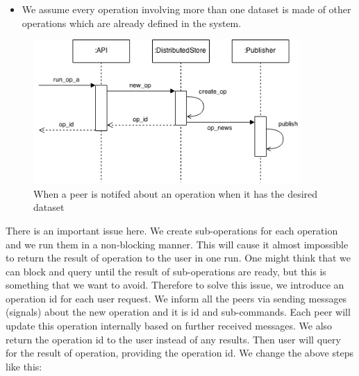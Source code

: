 \begin{itemize}
\item We assume every operation involving more than one dataset is made of
other operations which are already defined in the system.
\end{itemize}

\begin{figure}[h]
  \centering
  \includegraphics[width=4in]{poster/figures/kseq.png}
  \caption[Sequence diagram showing arrival of an operation message]
   {When a peer is notifed about an operation when it has the desired dataset}
\end{figure}

\iffalse

There is an important issue here. 
We create sub-operations for each operation and we run them in a non-blocking manner.
This will cause it almost impossible to return the result of operation to the user in one run.
One might think that we can block and query until the result of sub-operations are ready,
but this is something that we want to avoid.
Therefore to solve this issue,
we introduce an operation id for each user request.
We inform all the peers via sending messages (signals) about the new operation and it is id and sub-commands. 
Each peer will update this operation internally based on further received messages.
We also return the operation id to the user instead of any results. 
Then user will query for the result of operation, providing the operation id. 
We change the above steps like this:

